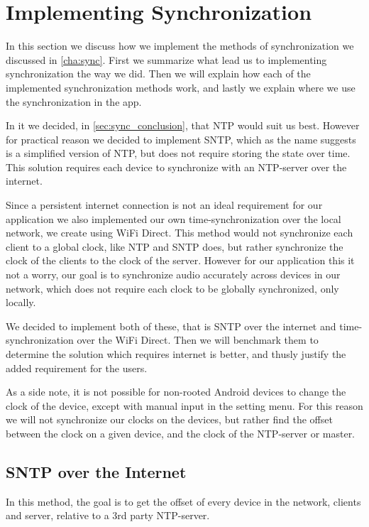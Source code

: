 \section{Implementing Synchronization}\label{sec:impl_sync}
In this section we discuss how we implement the methods of synchronization we discussed in \cref{cha:sync}.
First we summarize what lead us to implementing synchronization the way we did.
Then we will explain how each of the implemented synchronization methods work, and lastly we explain where we use the synchronization in the app.

In it we decided, in \cref{sec:sync_conclusion}, that NTP would suit us best.
However for practical reason we decided to implement \ac{SNTP}, which as the name suggests is a simplified version of \ac{NTP}, but does not require storing the state over time.
This solution requires each device to synchronize with an \ac{NTP}-server over the internet.

Since a persistent internet connection is not an ideal requirement for our application we also implemented our own time-synchronization over the local network, we create using WiFi Direct.
This method would not synchronize each client to a global clock, like \ac{NTP} and \ac{SNTP} does, but rather synchronize the clock of the clients to the clock of the server.
However for our application this it not a worry, our goal is to synchronize audio accurately across devices in our network, which does not require each clock to be globally synchronized, only locally.

We decided to implement both of these, that is \ac{SNTP} over the internet and time-synchronization over the WiFi Direct.
Then we will benchmark them to determine the solution which requires internet is better, and thusly justify the added requirement for the users.

As a side note, it is not possible for non-rooted Android devices to change the clock of the device, except with manual input in the setting menu.
For this reason we will not synchronize our clocks on the devices, but rather find the offset between the clock on a given device, and the clock of the \ac{NTP}-server or master.

\subsection{\ac{SNTP} over the Internet}
In this method, the goal is to get the offset of every device in the network, clients and server, relative to a 3rd party \ac{NTP}-server.


